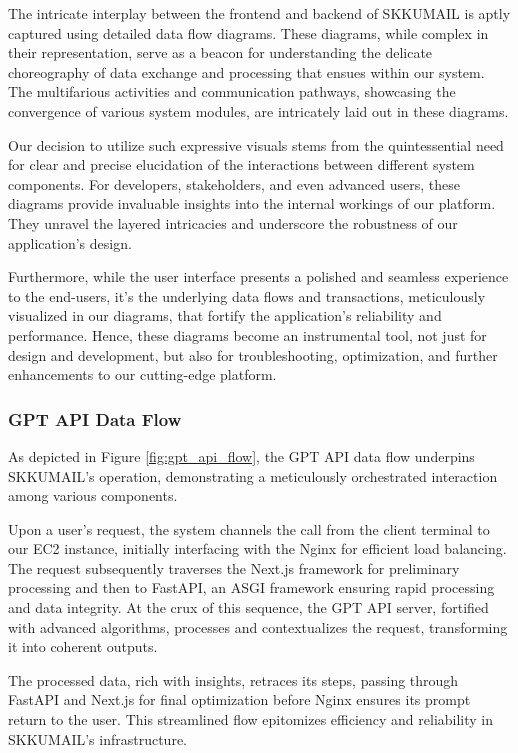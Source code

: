 The intricate interplay between the frontend and backend of SKKUMAIL is aptly captured using detailed data flow diagrams. These diagrams, while complex in their representation, serve as a beacon for understanding the delicate choreography of data exchange and processing that ensues within our system. The multifarious activities and communication pathways, showcasing the convergence of various system modules, are intricately laid out in these diagrams. 

Our decision to utilize such expressive visuals stems from the quintessential need for clear and precise elucidation of the interactions between different system components. For developers, stakeholders, and even advanced users, these diagrams provide invaluable insights into the internal workings of our platform. They unravel the layered intricacies and underscore the robustness of our application’s design.

Furthermore, while the user interface presents a polished and seamless experience to the end-users, it's the underlying data flows and transactions, meticulously visualized in our diagrams, that fortify the application's reliability and performance. Hence, these diagrams become an instrumental tool, not just for design and development, but also for troubleshooting, optimization, and further enhancements to our cutting-edge platform.


\subsubsection{GPT API Data Flow}

As depicted in Figure \ref{fig:gpt_api_flow}, the GPT API data flow underpins SKKUMAIL's operation, demonstrating a meticulously orchestrated interaction among various components.

Upon a user's request, the system channels the call from the client terminal to our EC2 instance, initially interfacing with the Nginx for efficient load balancing. The request subsequently traverses the Next.js framework for preliminary processing and then to FastAPI, an ASGI framework ensuring rapid processing and data integrity. At the crux of this sequence, the GPT API server, fortified with advanced algorithms, processes and contextualizes the request, transforming it into coherent outputs.

The processed data, rich with insights, retraces its steps, passing through FastAPI and Next.js for final optimization before Nginx ensures its prompt return to the user. This streamlined flow epitomizes efficiency and reliability in SKKUMAIL's infrastructure.


